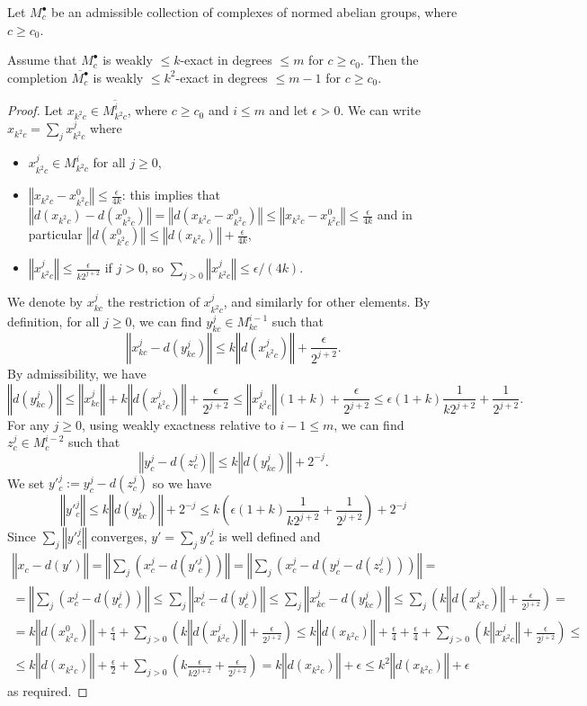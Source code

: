 \begin{lemma}
  \label{completion_is_weakexact}
  Let $M^\bullet_c$ be an admissible collection
  of complexes of normed abelian groups, where $c\geq c_0$.

  Assume that $M^\bullet_c$ is weakly $\leq k$-exact in degrees $\leq m$ for $c\geq c_0$.
  Then the completion $\overline{M^\bullet_c}$ is weakly $\leq k^2$-exact in degrees $\leq m-1$ for $c\geq c_0$.
\end{lemma}

\begin{proof}
Let $x_{k^2c} \in \overline{M^i_{k^2c}}$, where $c \geq c_0$ and $i \leq m$ and let $\epsilon > 0$. We can write $x_{k^2c} = \sum_j x^j_{k^2c}$ where
\begin{itemize}
 \item $x^j_{k^2c} \in M^i_{k^2c}$ for all $j \geq 0$,
 \item $‖x_{k^2c} - x^0_{k^2c}‖ \leq \frac{\epsilon}{4k}$: this implies that $‖d(x_{k^2c}) - d(x_{k^2c}^0)‖ = ‖d(x_{k^2c} - x_{k^2c}^0)‖ \leq ‖x_{k^2c} - x_{k^2c}^0‖ \leq \frac{\epsilon}{4k}$ and in particular $‖d(x_{k^2c}^0)‖ \leq ‖d(x_{k^2c})‖ + \frac{\epsilon}{4k}$,
 \item $‖x^j_{k^2c}‖ \leq \frac{\epsilon}{k2^{j+2}}$ if $j > 0$, so $\sum_{j > 0} ‖x^j_{k^2c}‖ \leq \epsilon/(4k)$.
\end{itemize}
We denote by $x^j_{kc}$ the restriction of $x^j_{k^2c}$, and similarly for other elements. By definition, for all $j \geq 0$, we can find $y^j_{kc} \in M^{i-1}_{kc}$ such that
\[
‖ x^j_{kc} - d(y^j_{kc}) ‖ \leq k‖d(x^j_{k^2c})‖ + \frac{\epsilon}{2^{j+2}}.
\]
By admissibility, we have
\[
‖ d(y^j_{kc}) ‖ \leq ‖x^j_{kc}‖ + k‖d(x^j_{k^2c})‖ + \frac{\epsilon}{2^{j+2}} \leq ‖x^j_{k^2c}‖(1 + k) + \frac{\epsilon}{2^{j+2}} \leq \epsilon(1+k)\frac{1}{k2^{j+2}} + \frac{1}{2^{j+2}}.
\]
For any $j \geq 0$, using weakly exactness relative to $i-1 \leq m$, we can find $z^j_c \in M^{i-2}_c$ such that
\[
‖ y^j_c - d(z^j_c) ‖ \leq k‖d(y^j_{kc})‖ + 2^{-j}.
\]
We set $y'^j_c := y^j_c - d(z^j_c)$ so we have
\[
‖y'^j_c‖ \leq k‖d(y^j_{kc})‖ + 2^{-j} \leq k(\epsilon(1+k)\frac{1}{k2^{j+2}} + \frac{1}{2^{j+2}}) + 2^{-j}
\]
Since $\sum _j ‖y'^j_c‖$ converges, $y' = \sum_j y'^j_c$ is well defined and
\[\begin{aligned}
‖x_c - d(y')‖ = ‖\sum_j ( x^j_c - d(y'^j_c))‖ = ‖\sum_j ( x^j_c - d(y^j_c - d(z^j_c)))‖ = \\
= ‖\sum_j ( x^j_c - d(y^j_c))‖ \leq \sum_j ‖ x^j_c - d(y^j_c) ‖ \leq \sum_j ‖ x^j_{kc} - d(y^j_{kc}) ‖ \leq \sum_j (k‖d(x^j_{k^2c})‖ + \frac{\epsilon}{2^{j+2}}) =\\
= k‖d(x^0_{k^2c})‖ + \frac{\epsilon}{4} + \sum_{j > 0} (k‖d(x^j_{k^2c})‖ + \frac{\epsilon}{2^{j+2}}) \leq k‖d(x_{k^2c})‖ + \frac{\epsilon}{4} + \frac{\epsilon}{4} + \sum_{j > 0} (k‖x^j_{k^2c}‖ + \frac{\epsilon}{2^{j+2}}) \leq \\
\leq k‖d(x_{k^2c})‖ + \frac{\epsilon}{2} + \sum_{j > 0} (k\frac{\epsilon}{k2^{j+2}} + \frac{\epsilon}{2^{j+2}}) = k‖d(x_{k^2c})‖ + \epsilon \leq k^2‖d(x_{k^2c})‖ + \epsilon
\end{aligned}\]
as required.
\end{proof}

